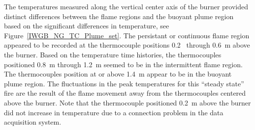 \documentclass[twoside]{uocthesis}
\begin{document}
{The temperatures measured along the vertical center axis of the burner provided distinct differences between the flame regions and the buoyant plume region based on the significant differences in temperature, see Figure~\ref{IWGB_NG_TC_Plume_set}.  The persistant or continuous flame region appeared to be recorded at the thermocouple positions 0.2~ through 0.6~m above the burner.  Based on the temperature time histories, the thermocouples positioned 0.8~m through 1.2~m seemed to be in the intermittent flame region.  The thermocouples position at or above 1.4~m appear to be in the buoyant plume region.  The fluctuations in the peak temperatures for this ``steady state'' fire are the result of the flame movement away from the thermocouples centered above the burner.  Note that the thermocouple positioned 0.2~m above the burner did not increase in temperature due to a connection problem in the data acquisition system.            

}
\end{document}
